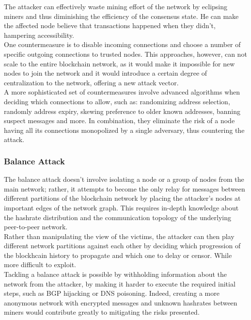 \documentclass[12pt,a4paper]{article}
\begin{document}
The attacker can effectively waste mining effort of the network by eclipsing miners and thus diminishing the efficiency of the consensus state. He can make the affected node believe that transactions happened when they didn't, hampering accessibility.\\

One countermeasure is to disable incoming connections and choose a number of specific outgoing connections to trusted nodes. This approaches, however, can not scale to the entire blockchain network, as it would make it impossible for new nodes to join the network and it would introduce a certain degree of centralization to the network, offering a new attack vector.\\

A more sophisticated set of countermeasures involve advanced algorithms when deciding which connections to allow, such as: randomizing address selection, randomly address expiry, skewing preference to older known addresses, banning suspect messages and more. In combination, they eliminate the risk of a node having all its connections monopolized by a single adversary, thus countering the attack.\\

\subsubsection{Balance Attack}

The balance attack doesn't involve isolating a node or a group of nodes from the main network; rather, it attempts to become the only relay for messages between different partitions of the blockchain network by placing the attacker's nodes at important edges of the network graph. This requires in-depth knowledge about the hashrate distribution and the communication topology of the underlying peer-to-peer network.\\

Rather than manipulating the view of the victims, the attacker can then play different network partitions against each other by deciding which progression of the blockhcain history to propagate and which one to delay or censor. While more difficult to exploit.\\

Tackling a balance attack is possible by withholding information about the network from the attacker, by making it harder to execute the required initial steps, such as BGP hijacking or DNS poisoning. Indeed, creating a more anonymous network with encrypted messages and unknown hashrates between miners would contribute greatly to mitigating the risks presented.\\
\end{document}
